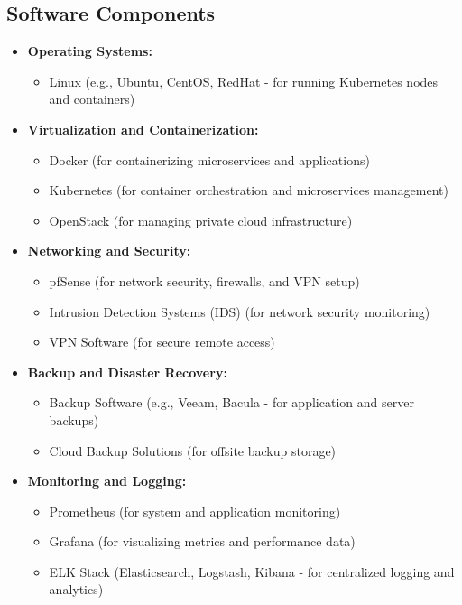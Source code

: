\subsection{Software Components}
\begin{itemize}
    \item \textbf{Operating Systems:}
    \begin{itemize}
        \item Linux (e.g., Ubuntu, CentOS, RedHat - for running Kubernetes nodes and containers)
    \end{itemize}
    \item \textbf{Virtualization and Containerization:}
    \begin{itemize}
        \item Docker (for containerizing microservices and applications)
        \item Kubernetes (for container orchestration and microservices management)
        \item OpenStack (for managing private cloud infrastructure)
    \end{itemize}
    \item \textbf{Networking and Security:}
    \begin{itemize}
        \item pfSense (for network security, firewalls, and VPN setup)
        \item Intrusion Detection Systems (IDS) (for network security monitoring)
        \item VPN Software (for secure remote access)
    \end{itemize}
    \item \textbf{Backup and Disaster Recovery:}
    \begin{itemize}
        \item Backup Software (e.g., Veeam, Bacula - for application and server backups)
        \item Cloud Backup Solutions (for offsite backup storage)
    \end{itemize}
    \item \textbf{Monitoring and Logging:}
    \begin{itemize}
        \item Prometheus (for system and application monitoring)
        \item Grafana (for visualizing metrics and performance data)
        \item ELK Stack (Elasticsearch, Logstash, Kibana - for centralized logging and analytics)

\end{itemize}
\end{itemize}
